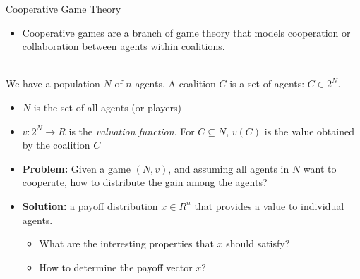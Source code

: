 \documentclass{beamer}
\begin{document}
\begin{frame}{Cooperative Game Theory}
    \begin{itemize}
         \item Cooperative games are a branch of game theory that models cooperation or collaboration between agents within coalitions.
    \end{itemize}
    \begin{definition} [Coalition]~\\
       We have a population $N$ of $n$ agents, A coalition $C$ is a set of agents: $C \in 2^N$.
        \begin{itemize}
            \item $N$ is the set of all agents (or players)
            \item $v:2^N \rightarrow R$ is the \emph{valuation function}. For $C \subseteq N$, $v(C)$ is the value obtained by the coalition $C$
        \end{itemize}
    \end{definition}

    \begin{itemize}
        \item \textbf{Problem:} Given a game $(N,v)$, and assuming all agents in $N$ want to cooperate, how to distribute the gain among the agents?
        \item \textbf{Solution:} a payoff distribution $x \in R^n$ that provides a value to individual agents.

        \begin{itemize}
            \item What are the interesting properties that $x$ should satisfy?
            \item How to determine the payoff vector $x$?
        \end{itemize}

    \end{itemize}
\end{frame}
\end{document}
